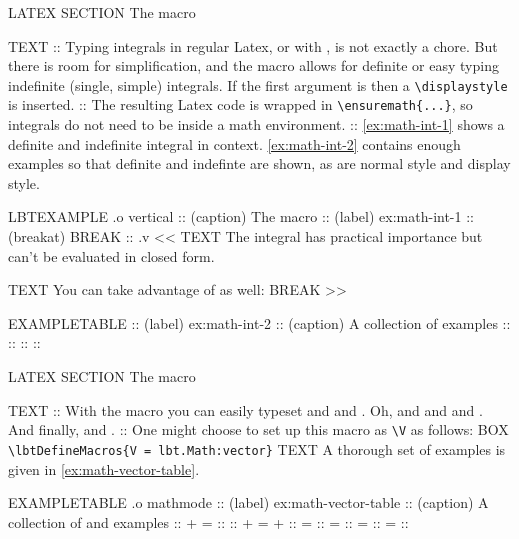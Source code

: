 \begin{lbt}
    LATEX \FloatBarrier
    SECTION The  macro

    TEXT
    :: Typing integrals in regular Latex, or with , is not exactly a chore. But there is room for simplification, and the  macro allows for definite or easy typing indefinite (single, simple) integrals. If the first argument is  then a \Verb|\displaystyle| is inserted.
    :: The resulting Latex code is wrapped in \Verb|\ensuremath{...}|, so integrals do not need to be inside a math environment.
    :: \cref{ex:math-int-1} shows a definite and indefinite integral in context. \cref{ex:math-int-2} contains enough examples so that definite and indefinte are shown, as are normal style and display style.

    LBTEXAMPLE .o vertical
    :: (caption) The  macro
    :: (label) ex:math-int-1
    :: (breakat) BREAK
    :: .v <<
      TEXT The integral  has practical importance but can't be evaluated in closed form.

      TEXT You can take advantage of  as well: BREAK 
    >>

    EXAMPLETABLE
    :: (label) ex:math-int-2
    :: (caption) A collection of  examples
    :: 
    :: 
    :: 
    :: 



    LATEX \FloatBarrier
    SECTION The  macro

    TEXT
    :: With the  macro you can easily typeset  and  and . Oh, and  and  and . And finally,  and .
    :: One might choose to set up this macro as \Verb|\V| as follows:
    BOX \verb|\lbtDefineMacros{V = lbt.Math:vector}|
    TEXT A thorough set of examples is given in \cref{ex:math-vector-table}.

    EXAMPLETABLE .o mathmode
    :: (label) ex:math-vector-table
    :: (caption) A collection of  and  examples
    ::  +  = 
    :: 
    ::  +  =  + 
    ::  = 
    ::  = 
    ::  = 
    ::  = 
    :: 


\end{lbt}
